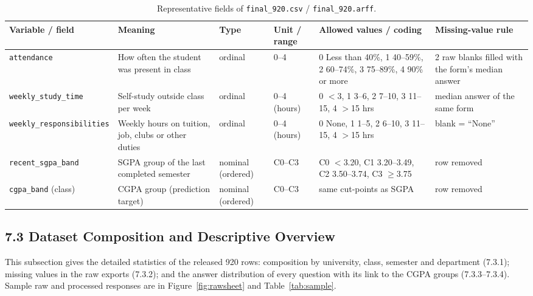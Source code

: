 \documentclass[11pt,a4paper]{article}
\newcommand{\hd}[1]{\textbf{#1}}
\begin{document}
\begin{table}[!htbp]
\centering\footnotesize
\caption{Representative fields of \texttt{final\_920.csv} / \texttt{final\_920.arff}.}
\label{tab:dict}
\begin{tabularx}{\linewidth}{|L{30mm}|Y|L{15mm}|L{13mm}|L{42mm}|L{22mm}|}
\hline
{}\hd{Variable / field} & \hd{Meaning} & \hd{Type} & \hd{Unit / range} & \hd{Allowed values / coding} & \hd{Missing-value rule} \\ \hline
\texttt{attendance} & How often the student was present in class & ordinal & 0--4 & 0 Less than 40\%, 1 40--59\%, 2 60--74\%, 3 75--89\%, 4 90\% or more & 2 raw blanks filled with the form's median answer \\ \hline
\texttt{weekly\_study\_time} & Self-study outside class per week & ordinal & 0--4 (hours) & 0 $<$3, 1 3--6, 2 7--10, 3 11--15, 4 $>$15 hrs & median answer of the same form \\ \hline
\texttt{weekly\_\allowbreak responsibilities} & Weekly hours on tuition, job, clubs or other duties & ordinal & 0--4 (hours) & 0 None, 1 1--5, 2 6--10, 3 11--15, 4 $>$15 hrs & blank = ``None'' \\ \hline
\texttt{recent\_sgpa\_band} & SGPA group of the last completed semester & nominal (ordered) & C0--C3 & C0 $<$3.20, C1 3.20--3.49, C2 3.50--3.74, C3 $\geq$3.75 & row removed \\ \hline
\texttt{cgpa\_band} (class) & CGPA group (prediction target) & nominal (ordered) & C0--C3 & same cut-points as SGPA & row removed \\ \hline
\end{tabularx}
\end{table}

\subsection{7.3 Dataset Composition and Descriptive Overview}
This subsection gives the detailed statistics of the released 920 rows: composition by university, class, semester and department (7.3.1); missing values in the raw exports (7.3.2); and the answer distribution of every question with its link to the CGPA groups (7.3.3--7.3.4). Sample raw and processed responses are in Figure~\ref{fig:rawsheet} and Table~\ref{tab:sample}.
\end{document}
